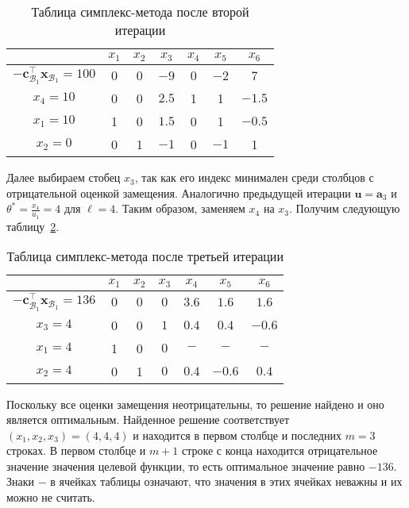 \documentclass[12pt]{article}
\newcommand{\bx}{\mathbf{x}}
\begin{document}
\begin{table}[!ht]
\centering
\caption{Таблица симплекс-метода после второй итерации}
\begin{tabular}{|c|cccccc|}
\hline
& $x_1$ & $x_2$ & $x_3$ & $x_4$ & $x_5$ & $x_6$\\
\hline
$-\mathbf{c}_{\mathcal{B}_1}^{\top}\bx_{\mathcal{B}_1} = 100$ & $0$ & $0$ & $-9$ & $0$ & $-2$ & $7$ \\
\hline
$x_4 = 10$ & 0 & 0 & $\mathbf{2.5}$ & 1 & 1 & $-1.5$ \\
$x_1 = 10$ & 1 & 0 & $1.5$ & 0 & 1 & $-0.5$ \\
$x_2 = 0$ & 0 & 1 & $-1$ & 0 & $-1$ & 1 \\
\hline
\end{tabular}
\label{tab::simplex2}
\end{table}

Далее выбираем стобец $x_3$, так как его индекс минимален среди столбцов с отрицательной оценкой замещения.
Аналогично предыдущей итерации $\mathbf{u} = \mathbf{a}_3$ и $\theta^* = \frac{x_4}{u_1} = 4$ для $\ell = 4$.
Таким образом, заменяем $x_4$ на $x_3$.
Получим следующую таблицу~\ref{tab::simplex3}.

\begin{table}[!ht]
\centering
\caption{Таблица симплекс-метода после третьей итерации}
\begin{tabular}{|c|cccccc|}
\hline
& $x_1$ & $x_2$ & $x_3$ & $x_4$ & $x_5$ & $x_6$\\
\hline
$-\mathbf{c}_{\mathcal{B}_1}^{\top}\bx_{\mathcal{B}_1} = 136$ & $0$ & $0$ & $0$ & $3.6$ & $1.6$ & $1.6$ \\
\hline
$x_3 = 4$ & 0 & 0 & $1$ & $0.4$ & $0.4$ & $-0.6$ \\
$x_1 = 4$ & 1 & 0 & $0$ & $-$ & $-$ & $-$ \\
$x_2 = 4$ & 0 & 1 & $0$ & $0.4$ & $-0.6$ & $0.4$ \\
\hline
\end{tabular}
\label{tab::simplex3}
\end{table}

Поскольку все оценки замещения неотрицательны, то решение найдено и оно является оптимальным. 
Найденное решение соответствует $(x_1, x_2, x_3) = (4,4,4)$ и находится в первом столбце и последних $m = 3$ строках.
В первом столбце и $m+1$ строке с конца находится отрицательное значение значения целевой функции, то есть оптимальное значение равно $-136$.
Знаки $-$ в ячейках таблицы означают, что значения в этих ячейках неважны и их можно не считать.
\end{document}
